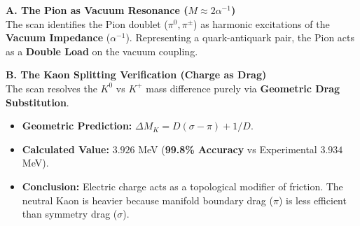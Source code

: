 \textbf{A. The Pion as Vacuum Resonance ($M \approx 2\alpha^{-1}$)} \\
The scan identifies the Pion doublet ($\pi^0, \pi^\pm$) as harmonic excitations of the \textbf{Vacuum Impedance} ($\alpha^{-1}$). Representing a quark-antiquark pair, the Pion acts as a \textbf{Double Load} on the vacuum coupling.

\textbf{B. The Kaon Splitting Verification (Charge as Drag)} \\
The scan resolves the $K^0$ vs $K^+$ mass difference purely via \textbf{Geometric Drag Substitution}.
\begin{itemize}
    \item \textbf{Geometric Prediction:} $\Delta M_K = D(\sigma - \pi) + 1/D$.
    \item \textbf{Calculated Value:} $3.926$ MeV (\textbf{99.8\% Accuracy} vs Experimental $3.934$ MeV).
    \item \textbf{Conclusion:} Electric charge acts as a topological modifier of friction. The neutral Kaon is heavier because manifold boundary drag ($\pi$) is less efficient than symmetry drag ($\sigma$).
\end{itemize}